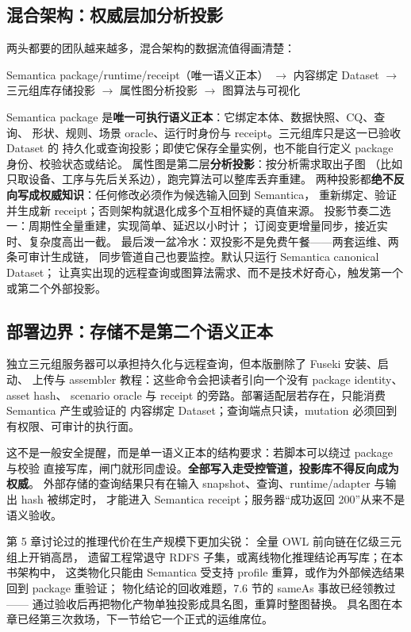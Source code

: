 \subsection{混合架构：权威层加分析投影}

两头都要的团队越来越多，混合架构的数据流值得画清楚：

\begin{center}
Semantica package/runtime/receipt（唯一语义正本）
\(\rightarrow\) 内容绑定 Dataset \(\rightarrow\) 三元组库存储投影
\(\rightarrow\) 属性图分析投影 \(\rightarrow\) 图算法与可视化
\end{center}

Semantica package 是\textbf{唯一可执行语义正本}：它绑定本体、数据快照、CQ、查询、
形状、规则、场景 oracle、运行时身份与 receipt。三元组库只是这一已验收 Dataset 的
持久化或查询投影；即使它保存全量实例，也不能自行定义 package 身份、校验状态或结论。
属性图是第二层\textbf{分析投影}：按分析需求取出子图
（比如只取设备、工序与先后关系边），跑完算法可以整库丢弃重建。
两种投影都\textbf{绝不反向写成权威知识}：任何修改必须作为候选输入回到 Semantica，
重新绑定、验证并生成新 receipt；否则架构就退化成多个互相怀疑的真值来源。
投影节奏二选一：周期性全量重建，实现简单、延迟以小时计；
订阅变更增量同步，接近实时、复杂度高出一截。
最后泼一盆冷水：双投影不是免费午餐——两套运维、两条可审计生成链，
同步管道自己也要监控。默认只运行 Semantica canonical Dataset；
让真实出现的远程查询或图算法需求、而不是技术好奇心，触发第一个或第二个外部投影。

\subsection{部署边界：存储不是第二个语义正本}

独立三元组服务器可以承担持久化与远程查询，但本版删除了 Fuseki 安装、启动、
上传与 assembler 教程：这些命令会把读者引向一个没有 package identity、asset hash、
scenario oracle 与 receipt 的旁路。部署适配层若存在，只能消费 Semantica 产生或验证的
内容绑定 Dataset；查询端点只读，mutation 必须回到有权限、可审计的执行面。

这不是一般安全提醒，而是单一语义正本的结构要求：若脚本可以绕过 package 与校验
直接写库，闸门就形同虚设。\textbf{全部写入走受控管道，投影库不得反向成为权威}。
外部存储的查询结果只有在输入 snapshot、查询、runtime/adapter 与输出 hash 被绑定时，
才能进入 Semantica receipt；服务器“成功返回 200”从来不是语义验收。

第 5 章讨论过的推理代价在生产规模下更加尖锐：
全量 OWL 前向链在亿级三元组上开销高昂，
遗留工程常退守 RDFS 子集，或离线物化推理结论再写库；在本书架构中，
这类物化只能由 Semantica 受支持 profile 重算，或作为外部候选结果回到 package 重验证；
物化结论的回收难题，7.6 节的 sameAs 事故已经领教过——
通过验收后再把物化产物单独投影成具名图，重算时整图替换。
具名图在本章已经第三次救场，下一节给它一个正式的运维席位。

